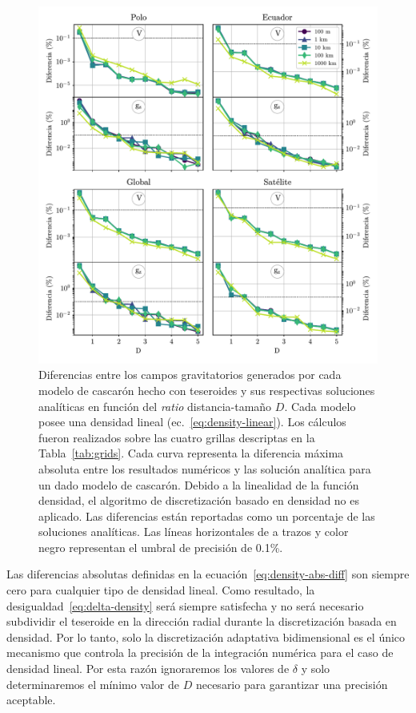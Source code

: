 \begin{figure}
\centering
\includegraphics[width=\linewidth]{figs/tesseroids-variable-density/linear-density-diffs.pdf}
\caption{
    Diferencias entre los campos gravitatorios generados por cada modelo de
    cascarón hecho con teseroides y sus respectivas soluciones analíticas en
    función del \emph{ratio} distancia-tamaño $D$.
    Cada modelo posee una densidad lineal (ec.~\ref{eq:density-linear}).
    Los cálculos fueron realizados sobre las cuatro grillas descriptas en la
    Tabla~\ref{tab:grids}.
    Cada curva representa la diferencia máxima absoluta entre los resultados
    numéricos y las solución analítica para un dado modelo de cascarón.
    Debido a la linealidad de la función densidad, el algoritmo de
    discretización basado en densidad no es aplicado.
    Las diferencias están reportadas como un porcentaje de las soluciones
    analíticas.
    Las líneas horizontales de a trazos y color negro representan el umbral de
    precisión de 0.1\%.
}
\label{fig:D-linear}
\end{figure}

Las diferencias absolutas definidas en la ecuación~\ref{eq:density-abs-diff}
son siempre cero para cualquier tipo de densidad lineal.
Como resultado, la desigualdad~\ref{eq:delta-density} será siempre satisfecha
y no será necesario subdividir el teseroide en la dirección radial durante la
discretización basada en densidad.
Por lo tanto, solo la discretización adaptativa bidimensional es el único
mecanismo que controla la precisión de la integración numérica para el caso de
densidad lineal.
Por esta razón ignoraremos los valores de $\delta$ y solo determinaremos el
mínimo valor de $D$ necesario para garantizar una precisión aceptable.

